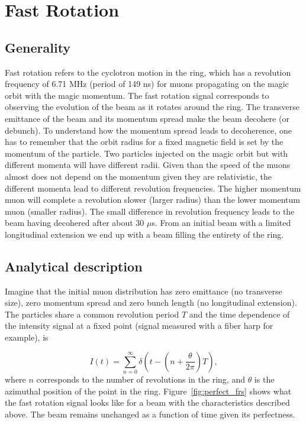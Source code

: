 \section{Fast Rotation}


\subsection{Generality}

Fast rotation refers to the cyclotron motion in the ring, which has a revolution frequency of 6.71 MHz (period of 149 ns) 
for muons propagating on the magic orbit with the magic momentum. 
The fast rotation signal corresponds to observing the evolution of the beam as it rotates around the ring. 
The transverse emittance of the beam and its momentum spread make the beam decohere (or debunch).
To understand how the momentum spread leads to decoherence, one has to remember that the orbit radius for a fixed magnetic
field is set by the momentum of the particle. Two particles injected on the magic orbit but with different momenta will
have different radii. Given than the speed of the muons almost does not depend on the momentum given they are relativistic,
the different momenta lead to different revolution frequencies. The higher momentum muon will complete a revolution
slower (larger radius) than the lower momentum muon (smaller radius). 
The small difference in revolution frequency leads to the beam having decohered after about 30 $\mu$s. 
From an initial beam with a limited longitudinal extension we end up with a beam filling the entirety of the ring.

\subsection{Analytical description}

Imagine that the initial muon distribution has zero emittance (no transverse size), zero momentum spread and zero bunch length (no longitudinal extension). 
The particles share a common revolution period $T$ and the time dependence of the intensity signal at a fixed point (signal measured with a fiber harp for example), is 

\begin{equation}
I(t)=\sum^{\infty}_{n=0}\delta\left(t-\left(n+\frac{\theta}{2\pi}\right)T\right),
\end{equation} 
where $n$ corresponds to the number of revolutions in the ring, and $\theta$ is the azimuthal position of the point in the ring.
Figure~\ref{fig:perfect_frs} shows what the fast rotation signal looks like for a beam with the characteristics described above. The beam remains unchanged as a function of time given its perfectness.

